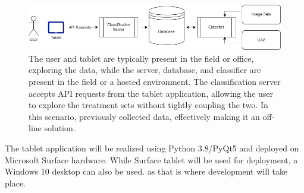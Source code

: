 \documentclass[12pt]{article}
\begin{document}
\begin{figure}[h]
	\centering
	\includegraphics[width=0.8\linewidth]{./figures/treatment-plan-explore.drawio.png}
	\caption[Simplified View of System Architecture]{The user and tablet are typically present in the field or office, exploring the data, while the server, database, and classifier are present in the field or a hosted environment. The classification server accepts API requests from the tablet application, allowing the user to explore the treatment sets without tightly coupling the two. In this scenario, previously collected data, effectively making it an off-line solution.}
	\label{fig:architecture}
\end{figure}

The tablet application will be realized using Python 3.8/PyQt5 and deployed on Microsoft Surface hardware. While Surface tablet will be used for deployment, a Windows 10 desktop can also be used. as that is where development will take place.
 
\end{document}
